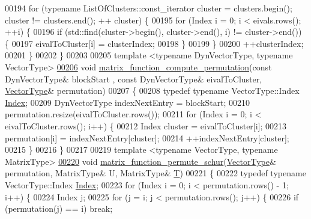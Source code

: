 \begin{DoxyCode}
00194   \textcolor{keywordflow}{for} (\textcolor{keyword}{typename} ListOfClusters::const\_iterator cluster = clusters.begin(); cluster != clusters.end(); ++
      cluster) \{
00195     \textcolor{keywordflow}{for} (Index i = 0; i < eivals.rows(); ++i) \{
00196       \textcolor{keywordflow}{if} (std::find(cluster->begin(), cluster->end(), i) != cluster->end()) \{
00197         eivalToCluster[i] = clusterIndex;
00198       \}
00199     \}
00200     ++clusterIndex;
00201   \}
00202 \}
00203 
00205 \textcolor{keyword}{template} <\textcolor{keyword}{typename} DynVectorType, \textcolor{keyword}{typename} VectorType>
\hyperlink{namespace_eigen_1_1internal_a0434fe5b0ec47e69b8e351ef9e131bcd}{00206} \textcolor{keywordtype}{void} \hyperlink{namespace_eigen_1_1internal_a0434fe5b0ec47e69b8e351ef9e131bcd}{matrix\_function\_compute\_permutation}(\textcolor{keyword}{const} DynVectorType& blockStart
      , \textcolor{keyword}{const} DynVectorType& eivalToCluster, \hyperlink{struct_vector_type}{VectorType}& permutation)
00207 \{
00208   \textcolor{keyword}{typedef} \textcolor{keyword}{typename} VectorType::Index \hyperlink{namespace_eigen_a62e77e0933482dafde8fe197d9a2cfde}{Index};
00209   DynVectorType indexNextEntry = blockStart;
00210   permutation.resize(eivalToCluster.rows());
00211   \textcolor{keywordflow}{for} (Index i = 0; i < eivalToCluster.rows(); i++) \{
00212     Index cluster = eivalToCluster[i];
00213     permutation[i] = indexNextEntry[cluster];
00214     ++indexNextEntry[cluster];
00215   \}
00216 \}  
00217 
00219 \textcolor{keyword}{template} <\textcolor{keyword}{typename} VectorType, \textcolor{keyword}{typename} MatrixType>
\hyperlink{namespace_eigen_1_1internal_a59cacdc2f9b480da246258bc9399aa2c}{00220} \textcolor{keywordtype}{void} \hyperlink{namespace_eigen_1_1internal_a59cacdc2f9b480da246258bc9399aa2c}{matrix\_function\_permute\_schur}(\hyperlink{struct_vector_type}{VectorType}& permutation, 
      MatrixType& U, MatrixType& \hyperlink{group___sparse_core___module}{T})
00221 \{
00222   \textcolor{keyword}{typedef} \textcolor{keyword}{typename} VectorType::Index \hyperlink{namespace_eigen_a62e77e0933482dafde8fe197d9a2cfde}{Index};
00223   \textcolor{keywordflow}{for} (Index i = 0; i < permutation.rows() - 1; i++) \{
00224     Index j;
00225     \textcolor{keywordflow}{for} (j = i; j < permutation.rows(); j++) \{
00226       \textcolor{keywordflow}{if} (permutation(j) == i) \textcolor{keywordflow}{break};

\end{DoxyCode}
